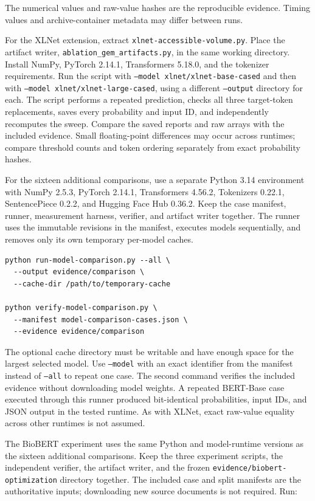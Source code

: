 \documentclass[11pt,a4paper]{article}
\begin{document}
The numerical values and raw-value hashes are the reproducible evidence. Timing values and archive-container metadata may differ between runs.

For the XLNet extension, extract \texttt{xlnet-accessible-volume.py}. Place the artifact writer, \texttt{ablation\_gem\_artifacts.py}, in the same working directory. Install NumPy, PyTorch 2.14.1, Transformers 5.18.0, and the tokenizer requirements. Run the script with \texttt{--model xlnet/xlnet-base-cased} and then with \texttt{--model xlnet/xlnet-large-cased}, using a different \texttt{--output} directory for each. The script performs a repeated prediction, checks all three target-token replacements, saves every probability and input ID, and independently recomputes the sweep. Compare the saved reports and raw arrays with the included evidence. Small floating-point differences may occur across runtimes; compare threshold counts and token ordering separately from exact probability hashes.

For the sixteen additional comparisons, use a separate Python 3.14 environment with NumPy 2.5.3, PyTorch 2.14.1, Transformers 4.56.2, Tokenizers 0.22.1, SentencePiece 0.2.2, and Hugging Face Hub 0.36.2. Keep the case manifest, runner, measurement harness, verifier, and artifact writer together. The runner uses the immutable revisions in the manifest, executes models sequentially, and removes only its own temporary per-model caches.

\begin{lstlisting}
python run-model-comparison.py --all \
  --output evidence/comparison \
  --cache-dir /path/to/temporary-cache

python verify-model-comparison.py \
  --manifest model-comparison-cases.json \
  --evidence evidence/comparison
\end{lstlisting}

The optional cache directory must be writable and have enough space for the largest selected model. Use \texttt{--model} with an exact identifier from the manifest instead of \texttt{--all} to repeat one case. The second command verifies the included evidence without downloading model weights. A repeated BERT-Base case executed through this runner produced bit-identical probabilities, input IDs, and JSON output in the tested runtime. As with XLNet, exact raw-value equality across other runtimes is not assumed.

The BioBERT experiment uses the same Python and model-runtime versions as the sixteen additional comparisons. Keep the three experiment scripts, the independent verifier, the artifact writer, and the frozen \texttt{evidence/biobert-optimization} directory together. The included case and split manifests are the authoritative inputs; downloading new source documents is not required. Run:
\end{document}
